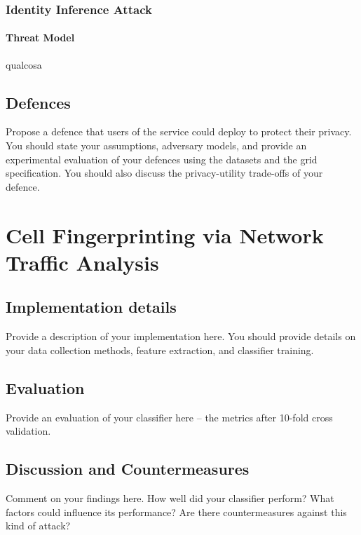 \documentclass[10pt,conference,compsocconf]{IEEEtran}
\begin{document}
\subsubsection{Identity Inference Attack}
\paragraph{Threat Model}
qualcosa

\subsection{Defences}
Propose a defence that users of the service could deploy to protect their privacy.  You
should state your assumptions, adversary models, and provide an experimental evaluation of your
defences using the datasets and the grid specification. You should also discuss the
privacy-utility trade-offs of your defence.

\section{Cell Fingerprinting via Network Traffic Analysis}

\subsection{Implementation details}
Provide a description of your implementation here. You should provide details on your data collection methods, feature extraction, and classifier training.

\subsection{Evaluation}
Provide an evaluation of your classifier here -- the metrics after 10-fold cross validation.

\subsection{Discussion and Countermeasures}
Comment on your findings here. How well did your classifier perform? What factors could influence its performance? Are there countermeasures against this kind of attack?



\end{document}
